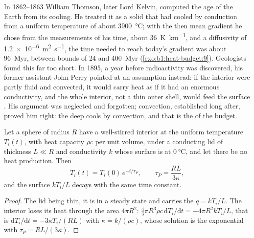 \begin{history}
In 1862--1863 William Thomson, later Lord Kelvin, computed the age of the Earth
from its cooling. He treated it as a solid that had cooled by conduction from
a uniform temperature of about \qty{3900}{\degreeCelsius}; with the then mean
gradient he chose from the measurements of his time, about
\qty{36}{K.km^{-1}}, and a diffusivity of
\qty{1.2e-6}{m^2.s^{-1}}, the time needed to reach today's gradient was about
\qty{96}{Myr}, between bounds of 24 and \qty{400}{Myr} (\cref{exo:b1:heat-budget:9}). Geologists
found this far too short. In 1895, a year
before radioactivity was discovered, his former assistant John Perry pointed at
an assumption instead: if the interior were partly fluid and convected, it
would carry heat as if it had an enormous conductivity, and the whole interior,
not a thin outer shell, would feed the surface . His argument was
neglected and forgotten;  convection, established long after, proved
him right: the deep  cools by convection, and that is the  of the budget. %
\end{history}

\begin{proposition}\label{prop:b1:heat-budget:perry}
Let a sphere of radius $R$ have a well-stirred interior at the uniform
temperature $T_i(t)$, with heat capacity $\rho c$ per unit volume, under a
conducting lid of thickness $L \ll R$ and conductivity $k$ whose surface is at
$\qty{0}{\degreeCelsius}$, and let there be no heat production. Then
\[
  T_i(t) = T_i(0)\,e^{-t/\tau_P}, \qquad \tau_P = \frac{RL}{3\kappa},
\]
and the surface  $kT_i/L$ decays with the same time constant.
\end{proposition}

\begin{proof}
The lid being thin, it is in a steady state and carries the 
$q = kT_i/L$. The interior loses its heat through the area $4\pi R^2$:
$\tfrac43\pi R^3\rho c\,\mathrm dT_i/\mathrm dt = -4\pi R^2 kT_i/L$, that is
$\mathrm dT_i/\mathrm dt = -3\kappa T_i/(RL)$ with $\kappa = k/(\rho c)$, whose
solution is the exponential with $\tau_P = RL/(3\kappa)$.
\end{proof}

